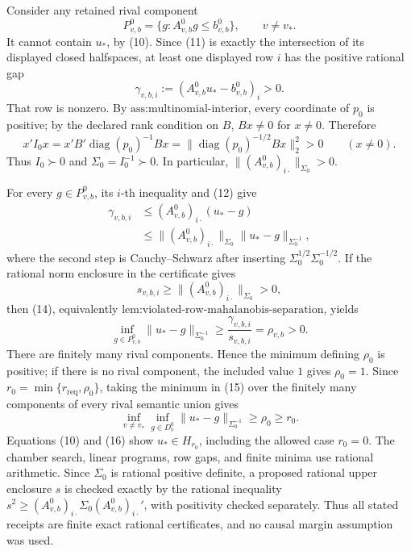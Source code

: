 Consider any retained rival component
\[
 P_{v,b}^0=\{g:A_{v,b}^0g\leq b_{v,b}^0\},
 \qquad v\ne v_*.
\tag{11}
\]
It cannot contain \(u_*\), by (10).  Since (11) is exactly the
intersection of its displayed closed halfspaces, at least one
displayed row \(i\) has the positive rational gap
\[
 \gamma_{v,b,i}
 :=(A_{v,b}^0u_*-b_{v,b}^0)_i>0.
\tag{12}
\]
That row is nonzero.  By \(\text{ass:multinomial-interior}\), every
coordinate of \(p_0\) is positive; by the declared rank condition on
\(B\), \(Bx\ne0\) for \(x\ne0\).  Therefore
\[
 x'I_0x
 =x'B'\operatorname{diag}(p_0)^{-1}Bx
 =\|\operatorname{diag}(p_0)^{-1/2}Bx\|_2^2>0
 \qquad(x\ne0).
\tag{13}
\]
Thus \(I_0\succ0\) and \(\Sigma_0=I_0^{-1}\succ0\).  In particular,
\(\|(A_{v,b}^0)_{i\cdot}\|_{\Sigma_0}>0\).

For every \(g\in P_{v,b}^0\), its \(i\)-th inequality and (12) give
\[
 \begin{aligned}
 \gamma_{v,b,i}
 &\leq (A_{v,b}^0)_{i\cdot}(u_*-g)\\
 &\leq
 \|(A_{v,b}^0)_{i\cdot}\|_{\Sigma_0}
 \|u_*-g\|_{\Sigma_0^{-1}},
 \end{aligned}
\tag{14}
\]
where the second step is Cauchy--Schwarz after inserting
\(\Sigma_0^{1/2}\Sigma_0^{-1/2}\).  If the rational norm enclosure in
the certificate gives
\[
 s_{v,b,i}\geq
 \|(A_{v,b}^0)_{i\cdot}\|_{\Sigma_0}>0,
\]
then (14), equivalently
\(\text{lem:violated-row-mahalanobis-separation}\), yields
\[
 \inf_{g\in P_{v,b}^0}
 \|u_*-g\|_{\Sigma_0^{-1}}
 \geq
 \frac{\gamma_{v,b,i}}{s_{v,b,i}}
 =\rho_{v,b}>0.
\tag{15}
\]
There are finitely many rival components.  Hence the minimum defining
\(\rho_0\) is positive; if there is no rival component, the included
value \(1\) gives \(\rho_0=1\).  Since
\(r_0=\min\{r_{\mathrm{req}},\rho_0\}\), taking the minimum in (15)
over the finitely many components of every rival semantic union gives
\[
 \inf_{v\ne v_*}\inf_{g\in D_v^0}
 \|u_*-g\|_{\Sigma_0^{-1}}
 \geq\rho_0\geq r_0.
\tag{16}
\]
Equations (10) and (16) show \(u_*\in H_{r_0}\), including the allowed
case \(r_0=0\).  The chamber search, linear programs, row gaps, and
finite minima use rational arithmetic.  Since \(\Sigma_0\) is rational
positive definite, a proposed rational upper enclosure \(s\) is
checked exactly by the rational inequality
\(s^2\geq (A_{v,b}^0)_{i\cdot}\Sigma_0
(A_{v,b}^0)_{i\cdot}'\), with positivity checked separately.
Thus all stated receipts are finite exact rational certificates, and
no causal margin assumption was used.

